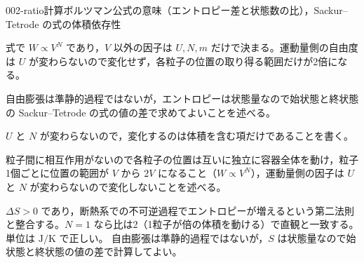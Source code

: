 \documentclass[uplatex,dvipdfmx,a4paper,11pt]{jsarticle}
\begin{document}
\begin{mondai}{002-ratio}{計算}{ボルツマン公式の意味（エントロピー差と状態数の比），Sackur--Tetrode の式の体積依存性}
\begin{tadashii}
 式で $W\propto V^{N}$ であり，$V$ 以外の因子は $U,N,m$ だけで決まる。運動量側の自由度は $U$ が変わらないので変化せず，各粒子の位置の取り得る範囲だけが2倍になる。
\begin{ronten}
  \item {} 自由膨張は準静的過程ではないが，エントロピーは状態量なので始状態と終状態の Sackur--Tetrode の式の値の差で求めてよいことを述べる。
  \item {} $U$ と $N$ が変わらないので，変化するのは体積を含む項だけであることを書く。
  \item {} 粒子間に相互作用がないので各粒子の位置は互いに独立に容器全体を動け，粒子1個ごとに位置の範囲が $V$ から $2V$ になること（$W\propto V^{N}$），運動量側の因子は $U$ と $N$ が変わらないので変化しないことを述べる。
\end{ronten}
\kenzan $\Delta S>0$ であり，断熱系での不可逆過程でエントロピーが増えるという第二法則と整合する。$N=1$ なら比は2（1粒子が倍の体積を動ける）で直観と一致する。単位は $\unit{\joule\per\kelvin}$ で正しい。
\tsumazuki 自由膨張は準静的過程ではないが，$S$ は状態量なので始状態と終状態の値の差で計算してよい。
\end{tadashii}
\end{mondai}
\end{document}
